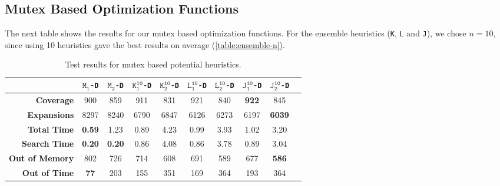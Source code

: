 \subsection{Mutex Based Optimization Functions}\label{subsec:mutex-based-optimization-functions}
The next table shows the results for our mutex based optimization functions.
For the ensemble heuristics (\texttt{K}, \texttt{L} and \texttt{J}), we chose $n=10$, since using 10 heuristics gave the best results on average (\autoref{table:ensemble-n}).
\begin{table}[h!]
    \begin{center}
        \begin{tabular}{|r|c|c|c|c|c|c|c|c|c|}
            \hline
            & \textbf{$\texttt{M}_\texttt{1}$\texttt{-D}} & \textbf{$\texttt{M}_\texttt{2}$\texttt{-D}} & \textbf{$\texttt{K}_\texttt{1}^\texttt{10}$\texttt{-D}} & \textbf{$\texttt{K}_\texttt{2}^\texttt{10}$\texttt{-D}} & \textbf{$\texttt{L}_\texttt{1}^\texttt{10}$\texttt{-D}} & \textbf{$\texttt{L}_\texttt{2}^\texttt{10}$\texttt{-D}} & \textbf{$\texttt{J}_\texttt{1}^\texttt{10}$\texttt{-D}} & \textbf{$\texttt{J}_\texttt{2}^\texttt{10}$\texttt{-D}}\\
            \hline \hline
            \textbf{Coverage}       & 900           & 859           & 911   & 831   & 921   & 840   & \textbf{922}  & 845   \\ \hline
            \textbf{Expansions}     & 8297          & 8240          & 6790  & 6847  & 6126  & 6273  & 6197          & \textbf{6039} \\ \hline
            \textbf{Total Time}     & \textbf{0.59} & 1.23          & 0.89  & 4.23  & 0.99  & 3.93  & 1.02          & 3.20  \\ \hline
            \textbf{Search Time}    & \textbf{0.20} & \textbf{0.20} & 0.86  & 4.08  & 0.86  & 3.78  & 0.89          & 3.04  \\ \hline
            \textbf{Out of Memory}  & 802           & 726           & 714   & 608   & 691   & 589   & 677           & \textbf{586}   \\ \hline
            \textbf{Out of Time}    & \textbf{77}   & 203           & 155   & 351   & 169   & 364   & 193           & 364   \\ \hline
        \end{tabular}
        \caption{Test results for mutex based potential heuristics.}
        \label{table:mutex_based_heuristics}
    \end{center}
\end{table}

